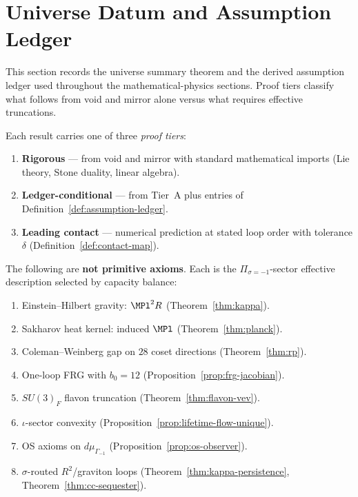 \section{Universe Datum and Assumption Ledger}
\label{sec:derivation-complete}

This section records the universe summary theorem and the derived assumption
ledger used throughout the mathematical-physics sections. Proof tiers classify
what follows from void and mirror alone versus what requires effective
truncations.

\begin{definition}\label{def:proof-tiers}
Each result carries one of three \emph{proof tiers}:
\begin{enumerate}[label=\textbf{Tier~\Alph* :},leftmargin=*]
  \item \textbf{Rigorous} --- from void and mirror with standard mathematical
    imports (Lie theory, Stone duality, linear algebra).
  \item \textbf{Ledger-conditional} --- from Tier~A plus entries of
    Definition~\ref{def:assumption-ledger}.
  \item \textbf{Leading contact} --- numerical prediction at stated loop order
    with tolerance $\delta$ (Definition~\ref{def:contact-map}).
\end{enumerate}
\end{definition}

\begin{definition}\label{def:assumption-ledger}
The following are \textbf{not primitive axioms}. Each is the
$\Pi_{\sigma=-1}$-sector effective description selected by capacity balance:
\begin{enumerate}[label=\textbf{A\arabic*},leftmargin=*]
  \item \label{asm:eh} Einstein--Hilbert gravity: $\MPl^2 R$
    (Theorem~\ref{thm:kappa}).
  \item \label{asm:sakharov} Sakharov heat kernel: induced $\MPl$
    (Theorem~\ref{thm:planck}).
  \item \label{asm:cw} Coleman--Weinberg gap on $28$ coset directions
    (Theorem~\ref{thm:rp}).
  \item \label{asm:frg} One-loop FRG with $b_0=12$
    (Proposition~\ref{prop:frg-jacobian}).
  \item \label{asm:flavon} $SU(3)_F$ flavon truncation
    (Theorem~\ref{thm:flavon-vev}).
  \item \label{asm:convex} $\iota$-sector convexity
    (Proposition~\ref{prop:lifetime-flow-unique}).
  \item \label{asm:os} OS axioms on $d\mu_{\Gamma_{-1}}$
    (Proposition~\ref{prop:os-observer}).
  \item \label{asm:grav-loops} $\sigma$-routed $R^2$/graviton loops
    (Theorem~\ref{thm:kappa-persistence}, Theorem~\ref{thm:cc-sequester}).
\end{enumerate}
\end{definition}

